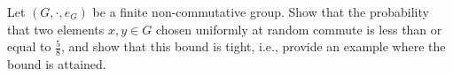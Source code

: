 \begin{problem}
    Let \( \left(G,\cdot,e_G\right) \) be a finite non-commutative group. Show that the probability that two elements \( x,y\in G \) chosen uniformly at random commute is less than or equal to \( \frac{5}{8} \), and show that this bound is tight, i.e., provide an example where the bound is attained.
\end{problem}
